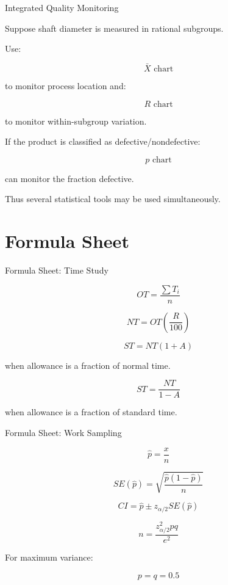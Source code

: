 \documentclass[aspectratio=169,10pt]{beamer}
\begin{document}
\begin{frame}[shrink=18]{Integrated Quality Monitoring}
\small

Suppose shaft diameter is measured in rational subgroups.

Use:

\[
\boxed{\bar X\text{ chart}}
\]

to monitor process location and:

\[
\boxed{R\text{ chart}}
\]

to monitor within-subgroup variation.

If the product is classified as defective/nondefective:

\[
\boxed{p\text{ chart}}
\]

can monitor the fraction defective.

Thus several statistical tools may be used simultaneously.

\end{frame}


\section{Formula Sheet}

\begin{frame}[shrink=18]{Formula Sheet: Time Study}
\small

\[
\boxed{
OT=\frac{\sum T_i}{n}
}
\]

\[
\boxed{
NT=OT\left(\frac{R}{100}\right)
}
\]

\[
\boxed{
ST=NT(1+A)
}
\]

when allowance is a fraction of normal time.

\[
\boxed{
ST=\frac{NT}{1-A}
}
\]

when allowance is a fraction of standard time.

\end{frame}


\begin{frame}[shrink=18]{Formula Sheet: Work Sampling}
\small

\[
\boxed{
\hat p=\frac{x}{n}
}
\]

\[
\boxed{
SE(\hat p)
=
\sqrt{
\frac{\hat p(1-\hat p)}{n}
}
}
\]

\[
\boxed{
CI=
\hat p
\pm
z_{\alpha/2}
SE(\hat p)
}
\]

\[
\boxed{
n=
\frac{
z_{\alpha/2}^{2}pq
}{
e^2
}
}
\]

For maximum variance:

\[
\boxed{
p=q=0.5
}
\]

\end{frame}
\end{document}
